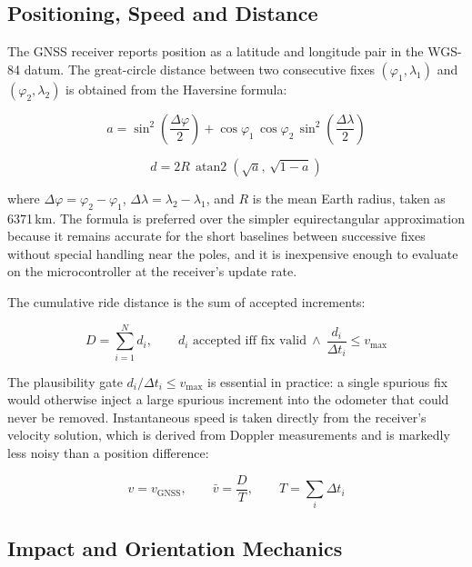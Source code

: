 \documentclass[12pt,a4paper,oneside]{report}
\newcommand{\SI}[2]{#1\,#2}
\begin{document}
\subsection{Positioning, Speed and Distance}

The GNSS receiver reports position as a latitude and longitude pair in the WGS-84 datum.
The great-circle distance between two consecutive fixes
\((\varphi_1,\lambda_1)\) and \((\varphi_2,\lambda_2)\) is obtained from the Haversine
formula:

\begin{equation}
a = \sin^{2}\!\left(\frac{\Delta\varphi}{2}\right)
  + \cos\varphi_1\,\cos\varphi_2\,\sin^{2}\!\left(\frac{\Delta\lambda}{2}\right)
\end{equation}

\begin{equation}
d = 2R\,\operatorname{atan2}\!\left(\sqrt{a},\,\sqrt{1-a}\right)
\end{equation}

where \(\Delta\varphi = \varphi_2-\varphi_1\), \(\Delta\lambda = \lambda_2-\lambda_1\), and
\(R\) is the mean Earth radius, taken as \SI{6371}{km}. The formula is preferred over the
simpler equirectangular approximation because it remains accurate for the short baselines
between successive fixes without special handling near the poles, and it is inexpensive
enough to evaluate on the microcontroller at the receiver's update rate.

The cumulative ride distance is the sum of accepted increments:

\begin{equation}
D = \sum_{i=1}^{N} d_i , \qquad
d_i \text{ accepted iff } \text{fix valid} \ \wedge\ \frac{d_i}{\Delta t_i} \le v_{\max}
\end{equation}

The plausibility gate \(d_i/\Delta t_i \le v_{\max}\) is essential in practice: a single
spurious fix would otherwise inject a large spurious increment into the odometer that could
never be removed. Instantaneous speed is taken directly from the receiver's velocity
solution, which is derived from Doppler measurements and is markedly less noisy than a
position difference:

\begin{equation}
v = v_{\text{GNSS}} , \qquad
\bar v = \frac{D}{T} , \qquad T = \sum_{i} \Delta t_i
\end{equation}

\subsection{Impact and Orientation Mechanics}
\end{document}
